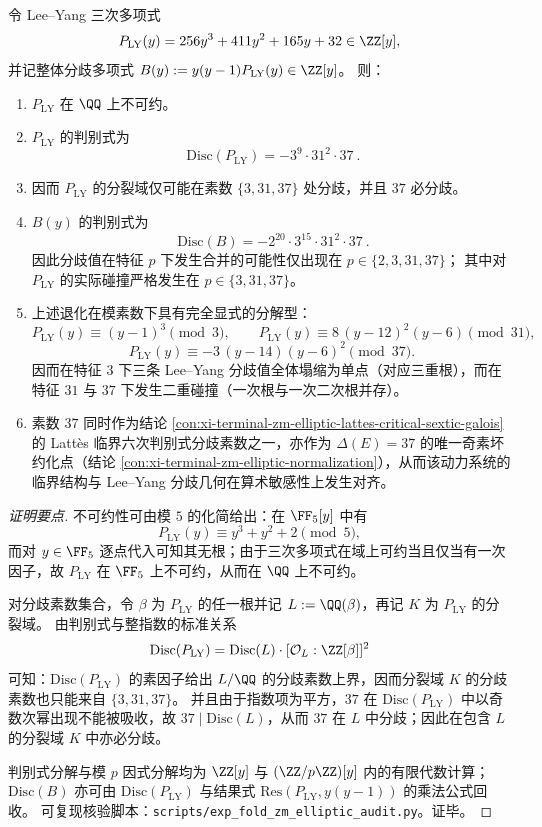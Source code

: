 \begin{conclusion}\label{con:xi-terminal-zm-leyang-branchpolynomial-discriminant-modp-collisions}
令 Lee--Yang 三次多项式
\[
P_{\mathrm{LY}}(y)=256y^3+411y^2+165y+32\in\ZZ[y],
\]
并记整体分歧多项式
\(
B(y):=y(y-1)P_{\mathrm{LY}}(y)\in\ZZ[y]
\)。
则：
\begin{enumerate}
  \item \(P_{\mathrm{LY}}\) 在 \(\QQ\) 上不可约。
  \item \(P_{\mathrm{LY}}\) 的判别式为
  \[
  \boxed{\ \mathrm{Disc}(P_{\mathrm{LY}})=-3^9\cdot 31^2\cdot 37\ }.
  \]
  \item 因而 \(P_{\mathrm{LY}}\) 的分裂域仅可能在素数 \(\{3,31,37\}\) 处分歧，并且 \(37\) 必分歧。
  \item \(B(y)\) 的判别式为
  \[
  \boxed{\ \mathrm{Disc}(B)=-2^{20}\cdot 3^{15}\cdot 31^2\cdot 37\ }.
  \]
  因此分歧值在特征 \(p\) 下发生合并的可能性仅出现在 \(p\in\{2,3,31,37\}\)；
  其中对 \(P_{\mathrm{LY}}\) 的实际碰撞严格发生在 \(p\in\{3,31,37\}\)。
  \item 上述退化在模素数下具有完全显式的分解型：
  \[
  P_{\mathrm{LY}}(y)\equiv (y-1)^3 \pmod 3,\qquad
  P_{\mathrm{LY}}(y)\equiv 8\,(y-12)^2(y-6)\pmod{31},
  \]
  \[
  P_{\mathrm{LY}}(y)\equiv -3\,(y-14)(y-6)^2\pmod{37}.
  \]
  因而在特征 \(3\) 下三条 Lee--Yang 分歧值全体塌缩为单点（对应三重根），而在特征 \(31\) 与 \(37\) 下发生二重碰撞（一次根与一次二次根并存）。
  \item 素数 \(37\) 同时作为结论 \ref{con:xi-terminal-zm-elliptic-lattes-critical-sextic-galois} 的 Latt\`es 临界六次判别式分歧素数之一，亦作为 \(\Delta(E)=37\) 的唯一奇素坏约化点（结论 \ref{con:xi-terminal-zm-elliptic-normalization}），从而该动力系统的临界结构与 Lee--Yang 分歧几何在算术敏感性上发生对齐。
\end{enumerate}
\end{conclusion}
\begin{proof}[证明要点]
不可约性可由模 \(5\) 的化简给出：在 \(\FF_5[y]\) 中有
\[
P_{\mathrm{LY}}(y)\equiv y^{3}+y^{2}+2\pmod 5,
\]
而对 \(y\in\FF_5\) 逐点代入可知其无根；由于三次多项式在域上可约当且仅当有一次因子，故 \(P_{\mathrm{LY}}\) 在 \(\FF_5\) 上不可约，从而在 \(\QQ\) 上不可约。
\par
对分歧素数集合，令 \(\beta\) 为 \(P_{\mathrm{LY}}\) 的任一根并记 \(L:=\QQ(\beta)\)，再记 \(K\) 为 \(P_{\mathrm{LY}}\) 的分裂域。
由判别式与整指数的标准关系
\[
\mathrm{Disc}(P_{\mathrm{LY}})=\mathrm{Disc}(L)\cdot[\mathcal O_L:\ZZ[\beta]]^{2}
\]
可知：\(\mathrm{Disc}(P_{\mathrm{LY}})\) 的素因子给出 \(L/\QQ\) 的分歧素数上界，因而分裂域 \(K\) 的分歧素数也只能来自 \(\{3,31,37\}\)。
并且由于指数项为平方，\(37\) 在 \(\mathrm{Disc}(P_{\mathrm{LY}})\) 中以奇数次幂出现不能被吸收，故 \(37\mid \mathrm{Disc}(L)\)，从而 \(37\) 在 \(L\) 中分歧；因此在包含 \(L\) 的分裂域 \(K\) 中亦必分歧。
\par
判别式分解与模 \(p\) 因式分解均为 \(\ZZ[y]\) 与 \((\ZZ/p\ZZ)[y]\) 内的有限代数计算；
\(\mathrm{Disc}(B)\) 亦可由 \(\mathrm{Disc}(P_{\mathrm{LY}})\) 与结果式 \(\mathrm{Res}(P_{\mathrm{LY}},y(y-1))\) 的乘法公式回收。
可复现核验脚本：\texttt{scripts/exp\_fold\_zm\_elliptic\_audit.py}。证毕。
\end{proof}

